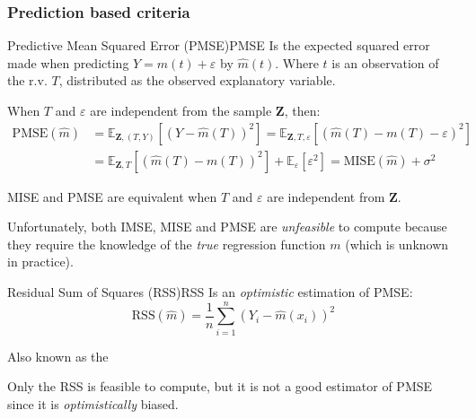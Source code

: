 \subsubsection{Prediction based criteria}
\begin{definition}{Predictive Mean Squared Error (PMSE)}{PMSE}
	Is the expected squared error made when predicting $Y = m(t) + \varepsilon$ by $\hat m(t)$.
	Where $t$ is an observation of the r.v. $T$, distributed as the observed explanatory variable.

	When $T$ and $\varepsilon$ are independent from the sample $\boldsymbol Z$, then:
	\begin{align*}
		\text{PMSE}(\hat m) & = \mathds{E}_{\boldsymbol Z,(T,Y)} \left[
			\left(Y - \hat m(T)\right)^2
			\right]
		= \mathds{E}_{\boldsymbol Z,T,\varepsilon} \left[
			\left(\hat m(T) - m(T) - \varepsilon\right)^2
		\right]                                                         \\
		                    & = \mathds{E}_{\boldsymbol Z,T} \left[
			\left(\hat m(T) - m(T)\right)^2
			\right] + \mathds{E}_\varepsilon\left[\varepsilon^2\right]
		= \text{MISE}(\hat m) + \sigma^2
	\end{align*}
	\tcblower
	\begin{note}
		MISE and PMSE are equivalent when $T$ and $\varepsilon$ are independent from $\boldsymbol Z$.
	\end{note}
\end{definition}

\begin{marker}
	Unfortunately, both IMSE, MISE and PMSE are \emph{unfeasible} to compute
	because they require the knowledge of the \emph{true} regression function
	$m$ (which is unknown in practice).
\end{marker}

\begin{definition}{Residual Sum of Squares (RSS)}{RSS}
	Is an \emph{optimistic} estimation of PMSE:
	\begin{equation*}
		\text{RSS}(\hat m) = \frac{1}{n} \sum_{i=1}^n \left( Y_i - \hat m(x_i) \right)^2
	\end{equation*}
	\tcblower
	\begin{note}
		Also known as the 
	\end{note}
\end{definition}

Only the RSS is feasible to compute, but it is not a good estimator of PMSE
since it is \emph{optimistically} biased.

